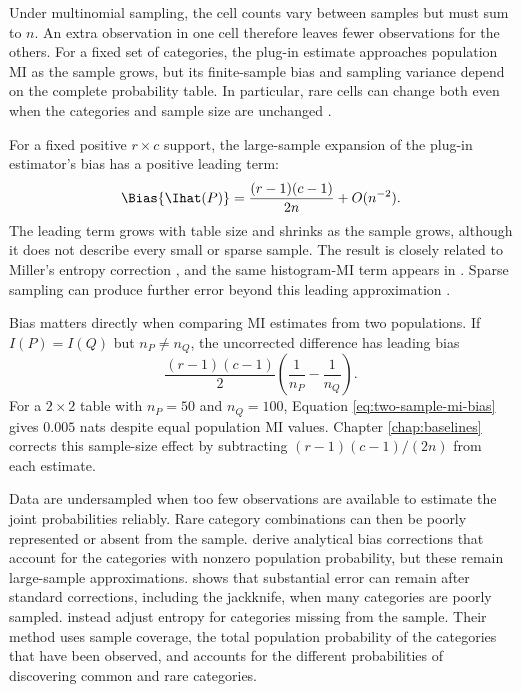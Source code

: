Under multinomial sampling, the cell counts vary between samples but must
sum to \(n\). An extra observation in one cell therefore leaves fewer
observations for the others. For a fixed set of categories, the plug-in
estimate approaches population MI as the sample grows, but its finite-sample
bias and sampling variance depend on the complete probability table. In particular,
rare cells can change both even when the categories and sample size are
unchanged
\citep{paninski2003}.

For a fixed positive \(r\times c\) support, the large-sample expansion of
the plug-in estimator's bias has a positive leading term:
\begin{equation}
  \Bias\{\Ihat(P)\}
  =\frac{(r-1)(c-1)}{2n}+O(n^{-2}).
  \label{eq:mi-leading-bias}
\end{equation}
The leading term grows with table size and shrinks as the sample grows,
although it does not describe every small or sparse sample. The result is closely related
to Miller's entropy correction \citep{miller1955}, and the same histogram-MI
term appears in \citet{moddemeijer1989}. Sparse sampling can produce further
error beyond this leading approximation \citep{paninski2003}.

Bias matters directly when comparing MI estimates from two populations. If
\(I(P)=I(Q)\) but \(n_P\ne n_Q\), the uncorrected difference has leading bias
\begin{equation}
  \frac{(r-1)(c-1)}{2}
  \left(\frac{1}{n_P}-\frac{1}{n_Q}\right).
  \label{eq:two-sample-mi-bias}
\end{equation}
For a \(2\times2\) table with \(n_P=50\) and \(n_Q=100\), Equation
\eqref{eq:two-sample-mi-bias} gives \(0.005\) nats despite equal population MI values. Chapter
\ref{chap:baselines} corrects this sample-size effect by subtracting
\((r-1)(c-1)/(2n)\) from each estimate.

\medskip
{}

Data are undersampled when too few observations are available to estimate
the joint probabilities reliably. Rare category combinations can then be
poorly represented or absent from the sample. \citet{panzeri1996} derive
analytical bias corrections that account
for the categories with nonzero population probability, but these remain
large-sample approximations. \citet{paninski2003} shows that substantial
error can remain after standard corrections, including the jackknife,
when many categories are poorly sampled. \citet{chaoshen2003} instead
adjust entropy for categories missing from the sample. Their method uses
sample coverage, the total population probability of the categories that
have been observed, and accounts for the different probabilities of
discovering common and rare categories.

